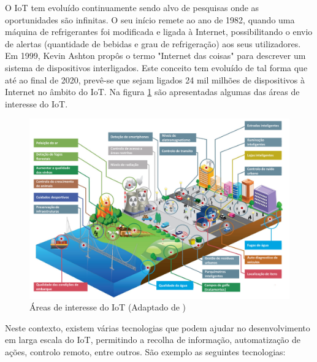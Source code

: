 	O IoT tem evoluído continuamente sendo alvo de pesquisas onde as oportunidades são infinitas. O seu início remete ao ano de 1982, quando uma máquina de refrigerantes foi modificada e ligada à Internet, possibilitando o envio de alertas (quantidade de bebidas e grau de refrigeração) aos seus utilizadores\cite{Farooq2015}. Em 1999, Kevin Ashton propôs o termo "Internet das coisas" para descrever um sistema de dispositivos interligados\cite{KevinAshton}. Este conceito tem evoluído de tal forma que até ao final de 2020, prevê-se que sejam ligados 24 mil milhões de dispositivos à Internet no âmbito do \acl{IoT}\cite{Rivera2014}. Na figura \ref{libelimaplic} são apresentadas algumas das áreas de interesse do \ac{IoT}\cite{Gubbi2013}. 
	

\begin{figure}[!htb]
	\centering
	\includegraphics[width=\linewidth]{esquemas/adaptacaoiot.pdf}
	\caption[]{Áreas de interesse do \ac{IoT} (Adaptado de \cite{Gubbi2013})}
	\label{libelimaplic}
\end{figure}


Neste contexto, existem várias tecnologias que podem ajudar no desenvolvimento em larga escala do IoT, permitindo a recolha de informação, automatização de ações, controlo remoto, entre outros\cite{Farooq2015}. São exemplo as seguintes tecnologias: 

